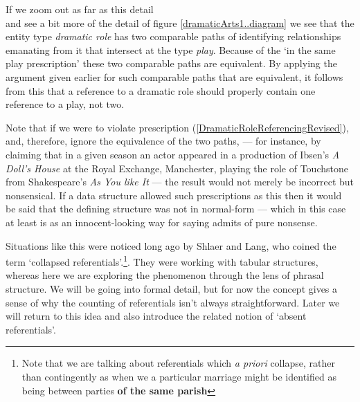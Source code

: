 If we zoom out as far as this detail
\begin{equation}
\label{dramaticArtsPortrayalScopeFragment..diagram}

\end{equation}
and see a bit more of the detail of figure \ref{dramaticArts1..diagram} we see that the entity type \textit{dramatic role}
has two comparable paths of identifying relationships  emanating from it that intersect at the type \textit{play}. 
Because of the
`in the same play prescription' these two comparable paths are equivalent. 
By applying the argument given earlier for such comparable paths that are equivalent,  it follows from this
that a reference to a dramatic role should properly contain one reference to a play, not two.

Note that if we were to violate prescription (\ref{DramaticRoleReferencingRevised}), 
and, therefore, ignore the equivalence of the two paths,
 --- for instance, by claiming that in a given season an actor appeared in a production
of  Ibsen's \textit{A Doll's House} at the Royal Exchange, Manchester, playing the role of Touchstone from Shakespeare's \textit{As You like It} --- the result would not merely be incorrect but nonsensical. If a data structure allowed such prescriptions as this then it would be said that the defining structure was not in normal-form ---  which in this case at least is as an innocent-looking way for saying admits of pure nonsense.

Situations like this were noticed long ago by Shlaer and Lang, 
who coined the term ‘collapsed referentials’.\footnote{Note that we are talking about referentials 
which \textit{a priori} collapse,
rather than contingently as when we a particular marriage might be identified as being between parties \textbf{of the same parish}}. They were working with tabular structures, whereas here we are exploring the phenomenon through the lens of phrasal structure. We will be going into formal detail, but for now the concept gives a sense of why the counting of referentials isn’t always straightforward. Later we will return to this idea and also introduce the related notion of ‘absent referentials’.

